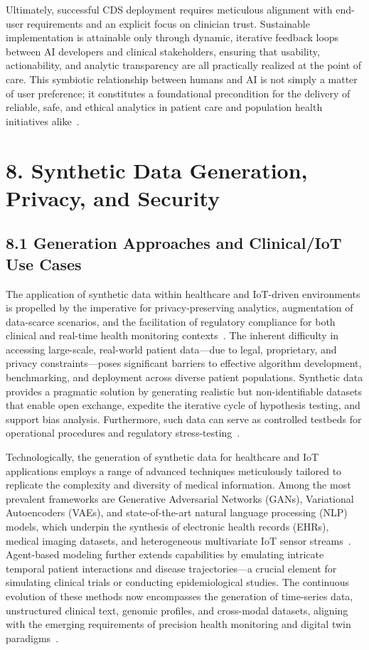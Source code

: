 \documentclass[11pt]{article}
\begin{document}
Ultimately, successful CDS deployment requires meticulous alignment with end-user requirements and an explicit focus on clinician trust. Sustainable implementation is attainable only through dynamic, iterative feedback loops between AI developers and clinical stakeholders, ensuring that usability, actionability, and analytic transparency are all practically realized at the point of care. This symbiotic relationship between humans and AI is not simply a matter of user preference; it constitutes a foundational precondition for the delivery of reliable, safe, and ethical analytics in patient care and population health initiatives alike~\cite{ref87,ref99,ref106}.

\section{8. Synthetic Data Generation, Privacy, and Security}

\subsection{8.1 Generation Approaches and Clinical/IoT Use Cases}

The application of synthetic data within healthcare and IoT-driven environments is propelled by the imperative for privacy-preserving analytics, augmentation of data-scarce scenarios, and the facilitation of regulatory compliance for both clinical and real-time health monitoring contexts~\cite{ref91, ref106}. The inherent difficulty in accessing large-scale, real-world patient data—due to legal, proprietary, and privacy constraints—poses significant barriers to effective algorithm development, benchmarking, and deployment across diverse patient populations. Synthetic data provides a pragmatic solution by generating realistic but non-identifiable datasets that enable open exchange, expedite the iterative cycle of hypothesis testing, and support bias analysis. Furthermore, such data can serve as controlled testbeds for operational procedures and regulatory stress-testing~\cite{ref91, ref106}.

Technologically, the generation of synthetic data for healthcare and IoT applications employs a range of advanced techniques meticulously tailored to replicate the complexity and diversity of medical information. Among the most prevalent frameworks are Generative Adversarial Networks (GANs), Variational Autoencoders (VAEs), and state-of-the-art natural language processing (NLP) models, which underpin the synthesis of electronic health records (EHRs), medical imaging datasets, and heterogeneous multivariate IoT sensor streams~\cite{ref91}. Agent-based modeling further extends capabilities by emulating intricate temporal patient interactions and disease trajectories—a crucial element for simulating clinical trials or conducting epidemiological studies. The continuous evolution of these methods now encompasses the generation of time-series data, unstructured clinical text, genomic profiles, and cross-modal datasets, aligning with the emerging requirements of precision health monitoring and digital twin paradigms~\cite{ref91, ref106}.
\end{document}

